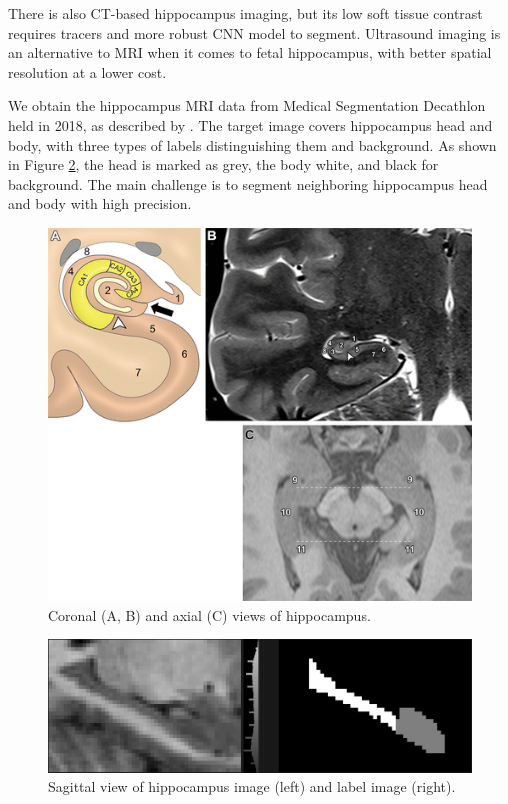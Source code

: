 \documentclass{article}
\begin{document}
There is also CT-based hippocampus imaging, but its low soft tissue contrast requires tracers and more robust CNN model to segment. Ultrasound imaging is an alternative to MRI when it comes to fetal hippocampus, with better spatial resolution at a lower cost.

We obtain the hippocampus MRI data from Medical Segmentation Decathlon held in 2018, as described by \citet{simpson2019large}. The target image covers hippocampus head and body, with three types of labels distinguishing them and background. As shown in Figure \ref{hippolabel}, the head is marked as grey, the body white, and black for background. The main challenge is to segment neighboring hippocampus head and body with high precision.

\begin{figure}
  \centering
  \includegraphics[scale=0.53]{./figs/hippoimg.png}
  \caption{Coronal (A, B) and axial (C) views of hippocampus.}
  \label{hippoimg}
\end{figure}

\begin{figure}
  \centering
  \includegraphics[scale=0.12]{./figs/hippolabel.png}
  \caption{Sagittal view of hippocampus image (left) and label image (right).}
  \label{hippolabel}
\end{figure}
\end{document}
